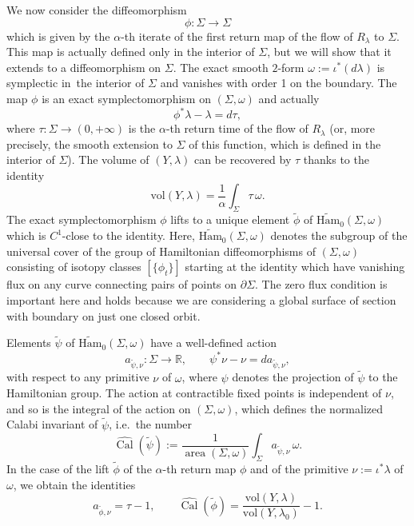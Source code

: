 \documentclass[10pt,a4paper]{amsart}
\providecommand{\ie}{i.e.\ }
\let\mathds\mathbb
\theoremstyle{definition}
\DeclareMathOperator{\area}{area}
\DeclareMathOperator{\Cal}{Cal}
\newcommand{\vol}{\mathrm{vol}}
\newcommand{\R}{\mathds{R}}
\providecommand{\ie}{i.e. }
\begin{document}
We now consider the diffeomorphism
\[
\phi: \Sigma\to \Sigma
\]
which is given by the $\alpha$-th iterate of the first return map of the flow of $R_{\lambda}$ to $\Sigma$. This map is actually defined only in the interior of $\Sigma$, but we will show that it extends to a diffeomorphism on $\Sigma$. The exact smooth $2$-form $\omega:= \iota^*(d\lambda)$ is symplectic in~the interior of $\Sigma$ and vanishes with order 1 on the boundary. The map $\phi$ is an exact symplectomorphism on $(\Sigma,\omega)$ and actually
\[
\phi^* \lambda - \lambda = d\tau,
\]
where $\tau: \Sigma \to (0,+\infty)$ is the $\alpha$-th return time of the flow of $R_{\lambda}$ (or, more precisely, the smooth extension to $\Sigma$ of this function, which is defined in the interior of $\Sigma$). The volume of $(Y,\lambda)$ can be recovered by $\tau$ thanks to the identity
\[
\vol(Y,\lambda) = \frac{1}{\alpha} \int_{\Sigma} \tau\, \omega.
\]
The exact symplectomorphism $\phi$ lifts to a unique element $\tilde\phi$ of $\widetilde{\mathrm{Ham}}_0(\Sigma,\omega)$ which is $C^1$-close to the identity. Here, $\widetilde{\mathrm{Ham}}_0(\Sigma,\omega)$ denotes the subgroup of the universal cover of the group of Hamiltonian diffeomorphisms of $(\Sigma,\omega)$ consisting of isotopy classes $[\{\phi_t\}]$ starting at the identity which have vanishing flux on any curve connecting pairs of points on $\partial \Sigma$. The zero flux condition is important here and holds because we are considering a global surface of section with boundary on just one closed orbit.

Elements $\tilde{\psi}$ of $\widetilde{\mathrm{Ham}}_0(\Sigma,\omega)$ have a well-defined action
\[
a_{\tilde{\psi},\nu} : \Sigma \to \R, \qquad \psi^* \nu - \nu = d a_{\tilde{\psi},\nu},
\]
with respect to any primitive $\nu$ of $\omega$, where $\psi$ denotes the projection of $\tilde{\psi}$ to the Hamiltonian group. The action at contractible fixed points is independent of $\nu$, and so is the integral of the action on $(\Sigma,\omega)$, which defines the normalized Calabi invariant of $\tilde{\psi}$, \ie the number
\[
\widehat{\Cal}(\tilde{\psi}) := \frac{1}{\area(\Sigma,\omega)} \int_{\Sigma} a_{\tilde{\psi},\nu} \, \omega.
\]
In the case of the lift $\tilde{\phi}$ of the $\alpha$-th return map $\phi$ and of the primitive $\nu:= \iota^*\lambda$ of $\omega$, we obtain the identities
\begin{equation}
\label{intro1}
a_{\tilde{\phi},\nu} = \tau - 1, \qquad \widehat{\Cal}(\tilde{\phi}) = \frac{\vol(Y,\lambda)}{\vol(Y,\lambda_0)} - 1.
\end{equation}
\end{document}
